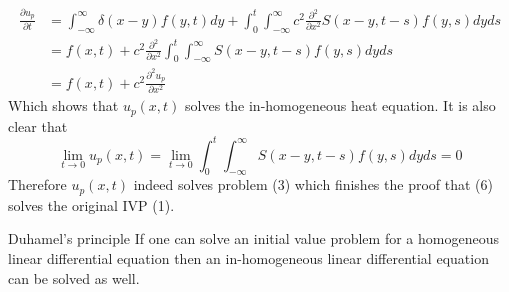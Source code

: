 \documentclass[]{article}
\begin{document}
\begin{align*}
    \frac{\partial u_p}{\partial t} &= \int_{-\infty}^{\infty}\delta(x-y) f(y,t) dy  + \int_{0}^{t}\int_{-\infty}^{\infty}c^2 \frac{\partial^2}{\partial x^2}S(x-y,t-s) f(y,s)dyds
    \\
    &= f(x,t) + c^2 \frac{\partial^2}{\partial x^2} \int_{0}^{t}\int_{-\infty}^{\infty}S(x-y,t-s) f(y,s)dyds
    \\
    &= f(x,t) + c^2 \frac{\partial^2 u_p}{\partial x^2}
\end{align*}
Which shows that $u_p(x,t)$ solves the in-homogeneous heat equation. It is also clear that
\[
\lim_{t \to 0} u_p(x,t)  = \lim_{t \to 0}\int_{0}^{t} \int_{-\infty}^{\infty}S(x-y,t-s) f(y,s)dyds = 0
\]
Therefore $u_p(x,t)$ indeed solves problem (3) which finishes the proof that (6) solves the original IVP (1).
\begin{enrichment*}{Duhamel's principle}
    If one can solve an initial value problem for a homogeneous linear differential equation then an in-homogeneous linear differential equation can be solved as well.
\end{enrichment*}
\end{document}
